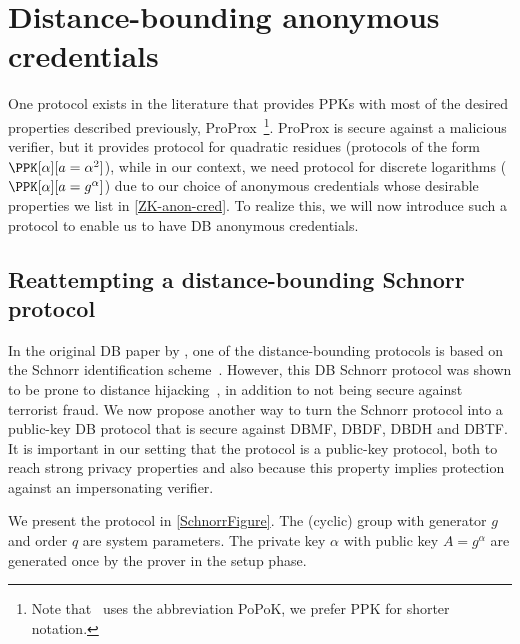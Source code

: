 \section{Distance-bounding anonymous credentials}%
\label{DB-anon-cred}

One protocol exists in the literature that provides \acp{PPK} with most of the desired properties described previously, ProProx~\cite{ProProx}\footnote{Note that~\cite{ProProx} uses the abbreviation PoPoK, we prefer \acs{PPK} for shorter notation.}.
ProProx is secure against a malicious verifier, but it provides  protocol for quadratic residues (\ie protocols of the form \(\PPK[\alpha][a = 
  \alpha^2]\)), while in our context, we need  protocol for discrete logarithms (\ie \(\PPK[\alpha][a = g^\alpha]\)) due to our choice of anonymous credentials whose desirable properties we list in \cref{ZK-anon-cred}.%
To realize this, we will now introduce such a protocol to enable us to have \ac{DB} anonymous credentials.

\subsection{Reattempting a distance-bounding Schnorr protocol}%
\label{DBSchnorr}

In the original \ac{DB} paper by \citet{DistanceBounding}, one of the distance-bounding protocols is based on the Schnorr identification scheme~\cite{Schnorr}.
However, this \ac{DB} Schnorr protocol was shown to be prone to distance hijacking~\cite{DistanceHijacking, TamarinDB}, in addition to not being secure against terrorist fraud.
We now propose another way to turn the Schnorr protocol into a public-key \ac{DB} protocol that is secure against \ac{DBMF}, \ac{DBDF}, \ac{DBDH} and \ac{DBTF}.
It is important in our setting that the protocol is a public-key protocol, both to reach strong privacy properties and also because this property implies protection against an impersonating verifier.

We present the protocol in \cref{SchnorrFigure}.
The (cyclic) group with generator \(g\) and order \(q\) are system parameters.
The private key \(\alpha\) with public key \(A = g^\alpha\) are generated once by the prover in the setup phase.

